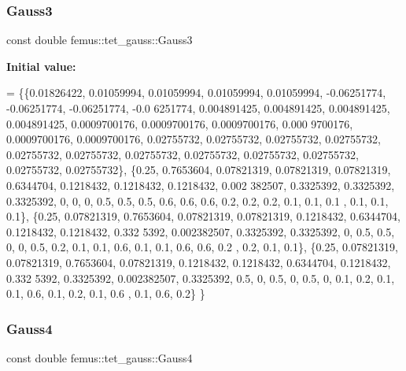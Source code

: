\subsubsection{\texorpdfstring{Gauss3}{Gauss3}}
{\footnotesize\ttfamily const double femus\+::tet\+\_\+gauss\+::\+Gauss3\hspace{0.3cm}{\ttfamily [static]}}

{\bfseries Initial value\+:}
\begin{DoxyCode}
= \{\{0.01826422, 0.01059994, 0.01059994, 0.01059994, 0.01059994, -0.06251774, -0.06251774, -0.06251774, -0.0
      6251774, 0.004891425, 0.004891425, 0.004891425, 0.004891425, 0.0009700176, 0.0009700176, 0.0009700176, 0.000
      9700176, 0.0009700176, 0.0009700176, 0.02755732, 0.02755732, 0.02755732, 0.02755732, 0.02755732, 0.02755732,
       0.02755732, 0.02755732, 0.02755732, 0.02755732, 0.02755732, 0.02755732\},
    \{0.25, 0.7653604, 0.07821319, 0.07821319, 0.07821319, 0.6344704, 0.1218432, 0.1218432, 0.1218432, 0.002
      382507, 0.3325392, 0.3325392, 0.3325392, 0, 0, 0, 0.5, 0.5, 0.5, 0.6, 0.6, 0.6, 0.2, 0.2, 0.2, 0.1, 0.1, 0.1
      , 0.1, 0.1, 0.1\},
    \{0.25, 0.07821319, 0.7653604, 0.07821319, 0.07821319, 0.1218432, 0.6344704, 0.1218432, 0.1218432, 0.332
      5392, 0.002382507, 0.3325392, 0.3325392, 0, 0.5, 0.5, 0, 0, 0.5, 0.2, 0.1, 0.1, 0.6, 0.1, 0.1, 0.6, 0.6, 0.2
      , 0.2, 0.1, 0.1\},
    \{0.25, 0.07821319, 0.07821319, 0.7653604, 0.07821319, 0.1218432, 0.1218432, 0.6344704, 0.1218432, 0.332
      5392, 0.3325392, 0.002382507, 0.3325392, 0.5, 0, 0.5, 0, 0.5, 0, 0.1, 0.2, 0.1, 0.1, 0.6, 0.1, 0.2, 0.1, 0.6
      , 0.1, 0.6, 0.2\}
  \}
\end{DoxyCode}
\mbox{\label{classfemus_1_1tet__gauss_a96a28c287f5d6e91e3df80a4575178ab}} 
\subsubsection{\texorpdfstring{Gauss4}{Gauss4}}
{\footnotesize\ttfamily const double femus\+::tet\+\_\+gauss\+::\+Gauss4\hspace{0.3cm}{\ttfamily [static]}}

